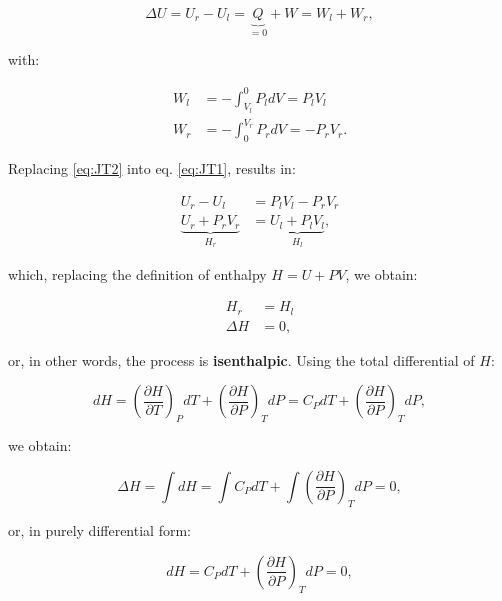 \documentclass[
  9pt,
]{extbook}
\theoremstyle{definition}
\theoremstyle{definition}
\theoremstyle{definition}
\theoremstyle{remark}
\begin{document}
\begin{equation}
\Delta U=U_r-U_l=\underbrace{Q}_{=0}+W=W_l+W_r,
\label{eq:JT1}
\end{equation}

with:

\begin{equation}
\begin{aligned}
W_l &=-\int_{V_l}^0 P_l dV = P_l V_l\\
W_r &=-\int_0^{V_r} P_r dV = - P_r V_r.
\end{aligned}
\label{eq:JT2}
\end{equation}

Replacing \eqref{eq:JT2} into eq. \eqref{eq:JT1}, results in:

\begin{equation}
\begin{aligned}
U_r-U_l &=P_l V_l-P_r V_r \\
\underbrace{U_r+P_r V_r}_{H_r} &= \underbrace{U_l + P_l V_l}_{H_l},
\end{aligned}
\label{eq:JT3}
\end{equation}

which, replacing the definition of enthalpy \(H=U+PV\), we obtain:

\begin{equation}
\begin{aligned}
H_r &=H_l \\
\Delta H &=0,
\end{aligned}
\label{eq:JT4}
\end{equation}

or, in other words, the process is \textbf{isenthalpic}. Using the total differential of \(H\):

\begin{equation}
dH=\left(\frac{\partial H}{\partial T} \right)_P dT + \left(\frac{\partial H}{\partial P} \right)_T dP = C_P dT + \left(\frac{\partial H}{\partial P} \right)_T dP,
\label{eq:JT5}
\end{equation}

we obtain:

\begin{equation}
\Delta H=\int dH = \int C_P dT + \int \left(\frac{\partial H}{\partial P} \right)_T dP =0,
\label{eq:JT6b}
\end{equation}

or, in purely differential form:

\begin{equation}
dH = C_P dT + \left(\frac{\partial H}{\partial P} \right)_T dP =0,
\label{eq:JT6}
\end{equation}
\end{document}
